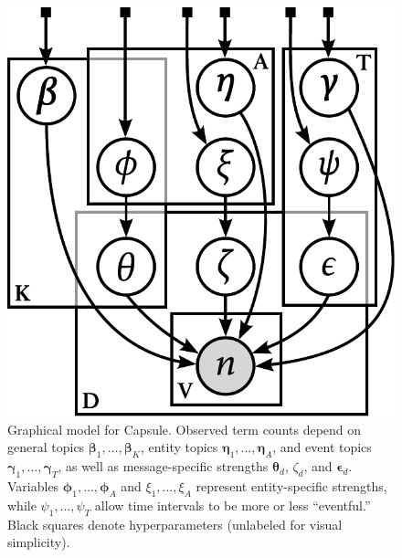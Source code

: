 \begin{figure}[bt]
\centering
\includegraphics[width=0.6\linewidth]{fig/graphicalmodel.pdf}
\caption{Graphical model for Capsule. Observed term counts depend on
  general topics $\mathbold{\beta}_1, \ldots, \mathbold{\beta}_K$,
  entity topics $\mathbold{\eta}_1, \ldots, \mathbold{\eta}_A$, and
  event topics $\mathbold{\gamma}_1, \ldots, \mathbold{\gamma}_T$, as
  well as message-specific strengths $\mathbold{\theta}_d$, $\zeta_d$,
  and $\mathbold{\epsilon}_d$.  Variables $\mathbold{\phi}_1, \ldots,
  \mathbold{\phi}_A$ and $\xi_1, \ldots, \xi_A$ represent
  entity-specific strengths, while $\psi_1, \ldots, \psi_T$ allow time
  intervals to be more or less ``eventful.'' Black squares denote
  hyperparameters (unlabeled for visual simplicity).}
\label{fig:graphicalmodel}
\end{figure}

